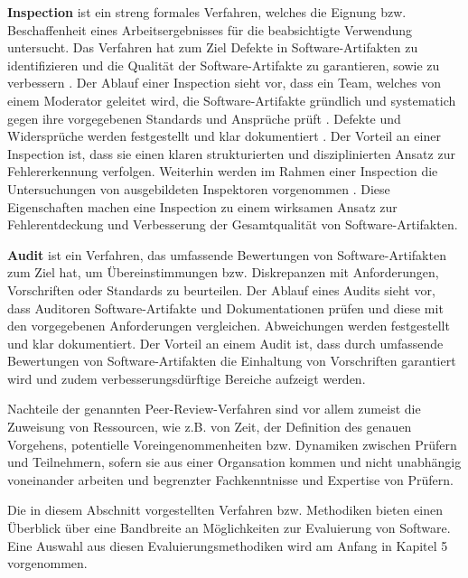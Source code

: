 \textbf{Inspection} ist ein streng formales Verfahren, welches die Eignung bzw. Beschaffenheit eines Arbeitsergebnisses für die beabsichtigte Verwendung untersucht.
Das Verfahren hat zum Ziel Defekte in Software-Artifakten zu identifizieren und die Qualität der Software-Artifakte zu garantieren, sowie zu verbessern \cite{ieee-1028-2008}.
Der Ablauf einer Inspection sieht vor, dass ein Team, welches von einem Moderator geleitet wird, die Software-Artifakte gründlich und systematich gegen ihre vorgegebenen Standards und Ansprüche prüft \cite{ieee-1028-2008}.
Defekte und Widersprüche werden festgestellt und klar dokumentiert \cite{ieee-1028-2008}.
Der Vorteil an einer Inspection ist, dass sie einen klaren strukturierten und disziplinierten Ansatz zur Fehlererkennung verfolgen.
Weiterhin werden im Rahmen einer Inspection die Untersuchungen von ausgebildeten Inspektoren vorgenommen \cite{ieee-1028-2008}.
Diese Eigenschaften machen eine Inspection zu einem wirksamen Ansatz zur Fehlerentdeckung und Verbesserung der Gesamtqualität von Software-Artifakten.

\textbf{Audit} ist ein Verfahren, das umfassende Bewertungen von Software-Artifakten zum Ziel hat, um Übereinstimmungen bzw. Diskrepanzen mit Anforderungen, Vorschriften oder Standards zu beurteilen.
Der Ablauf eines Audits sieht vor, dass Auditoren Software-Artifakte und Dokumentationen prüfen und diese mit den vorgegebenen Anforderungen vergleichen.
Abweichungen werden festgestellt und klar dokumentiert.
Der Vorteil an einem Audit ist, dass durch umfassende Bewertungen von Software-Artifakten die Einhaltung von Vorschriften garantiert wird und zudem verbesserungsdürftige Bereiche aufzeigt werden.

Nachteile der genannten Peer-Review-Verfahren sind vor allem zumeist die Zuweisung von Ressourcen, wie z.B. von Zeit, der Definition des genauen Vorgehens, potentielle Voreingenommenheiten bzw. Dynamiken zwischen Prüfern und Teilnehmern, sofern sie aus einer Organsation kommen und nicht unabhängig voneinander arbeiten und begrenzter Fachkenntnisse und Expertise von Prüfern.

Die in diesem Abschnitt vorgestellten Verfahren bzw. Methodiken bieten einen Überblick über eine Bandbreite an Möglichkeiten zur Evaluierung von Software.
Eine Auswahl aus diesen Evaluierungsmethodiken wird am Anfang in Kapitel 5 vorgenommen.

